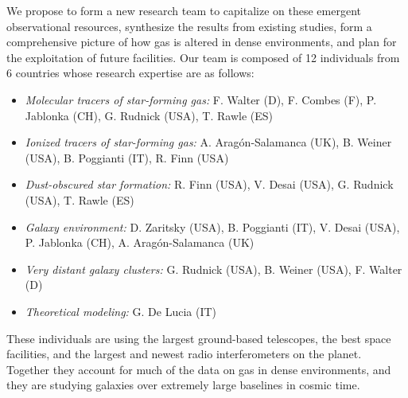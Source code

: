 \documentclass[11pt]{article}
\begin{document}
We propose to form a new research team to capitalize on these emergent
observational resources, synthesize the results from existing studies,
form a comprehensive picture of how gas is altered in dense
environments, and plan for the exploitation of future facilities.  Our
team is composed of 12 individuals from 6 countries whose research
expertise are as follows:
\vspace{-0.15in}
\begin{itemize}
\item \textit{Molecular tracers of star-forming gas:} F. Walter (D), F. Combes (F),
  P. Jablonka (CH), G. Rudnick (USA), T. Rawle (ES)
\vspace{-0.1in}
\item \textit{Ionized tracers of star-forming gas:} A. Arag\'{o}n-Salamanca (UK), B. Weiner (USA), B. Poggianti (IT), R. Finn (USA)
\vspace{-0.1in}
\item \textit{Dust-obscured star formation:} R. Finn (USA), V. Desai (USA), G. Rudnick (USA), T. Rawle (ES)
\vspace{-0.1in}
\item \textit{Galaxy environment:} D. Zaritsky (USA), B. Poggianti (IT), V. Desai (USA), P. Jablonka (CH), A. Arag\'{o}n-Salamanca (UK)
\vspace{-0.1in}
\item \textit{Very distant galaxy clusters:} G. Rudnick (USA), B. Weiner (USA), F. Walter (D)
\vspace{-0.1in}
\item \textit{Theoretical modeling:} G. De Lucia (IT)
\end{itemize} 
\vspace{-0.1in}
These individuals are using the largest ground-based telescopes, the
best space facilities, and the largest and newest radio
interferometers on the planet.  Together they account for much
of the data on gas in dense environments, and they are studying galaxies
over extremely large baselines in cosmic time.  
\end{document}
